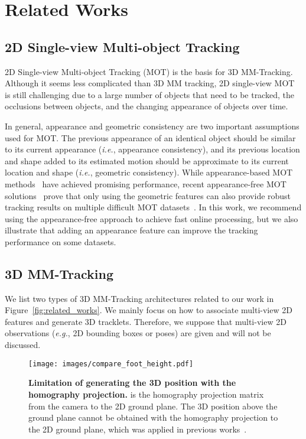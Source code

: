\documentclass{CVM}
\newcommand{\ie}{{\it i.e.}}
\newcommand{\eg}{{\it e.g.}}
\begin{document}
\section{Related Works}\label{sec:related_works}




  \subsection{2D Single-view Multi-object Tracking}

  2D Single-view Multi-object Tracking (MOT) is the basis for 3D MM-Tracking. Although it seems less complicated than 3D MM tracking, 2D single-view MOT is still challenging due to a large number of objects that need to be tracked, the occlusions between objects, and the changing appearance of objects over time. 

  In general, appearance and geometric consistency are two important assumptions used for MOT. The previous appearance of an identical object should be similar to its current appearance (\ie, appearance consistency), and its previous location and shape added to its estimated motion should be approximate to its current location and shape (\ie, geometric consistency). While appearance-based MOT methods~\cite{yang2022tackling, zeng2022motr, zhou2022global} have achieved promising performance, recent appearance-free MOT solutions~\cite{du2022strongsort, CBIOU_2023_WACV} prove that only using the geometric features can also provide robust tracking results on multiple difficult MOT datasets~\cite{giancola2022soccernet}. In this work, we recommend using the appearance-free approach to achieve fast online processing, but we also illustrate that adding an appearance feature can improve the tracking performance on some datasets.



  \subsection{3D MM-Tracking}


  We list two types of 3D MM-Tracking architectures related to our work in Figure~\ref{fig:related_works}.
  We mainly focus on how to associate multi-view 2D features and generate 3D tracklets. Therefore, we suppose that multi-view 2D observations (\eg, 2D bounding boxes or poses) are given and will not be discussed.

  \begin{figure}[!h]
    \centering
    \texttt{[image: images/compare\_foot\_height.pdf]}
    \captionsetup{font=small}
    \caption{\textbf{Limitation of generating the 3D position with the homography projection.}  is the homography projection matrix from the camera  to the 2D ground plane. The 3D position above the ground plane cannot be obtained with the homography projection to the 2D ground plane, which was applied in previous works~\cite{sternig2011multi,wen2017multi,kohl2020mta,he2020multi}.}
    \label{fig:compare_3d_pos}
  \end{figure}
\end{document}
